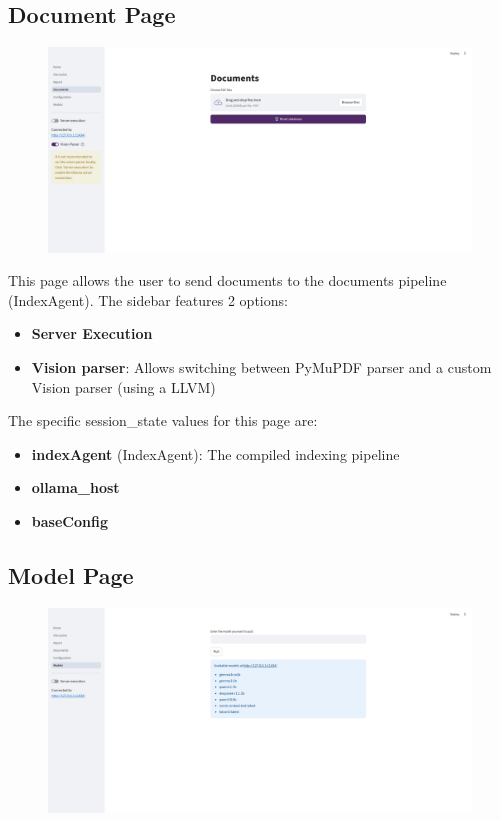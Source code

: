 \documentclass[11pt,a4paper]{report}
\begin{document}
\subsection{Document Page}

\begin{figure}[H]
    \centering
    \includegraphics[width=\linewidth]{static/figures/documentPage.png}
    \label{fig:documentPage}
\end{figure}

This page allows the user to send documents to the documents pipeline (IndexAgent). The sidebar features 2 options:

\begin{itemize}
    \item \textbf{Server Execution}
    \item \textbf{Vision parser}: Allows switching between PyMuPDF parser and a custom Vision parser (using a LLVM)
\end{itemize}

The specific session\_state values for this page are:
\begin{itemize}
    \item \textbf{indexAgent} (IndexAgent): The compiled indexing pipeline
    \item \textbf{ollama\_host}
    \item \textbf{baseConfig}
\end{itemize}

\subsection{Model Page}

\begin{figure}[H]
    \centering
    \includegraphics[width=\linewidth]{static/figures/modelPage.png}
    \label{fig:modelPage}
\end{figure}
\end{document}
